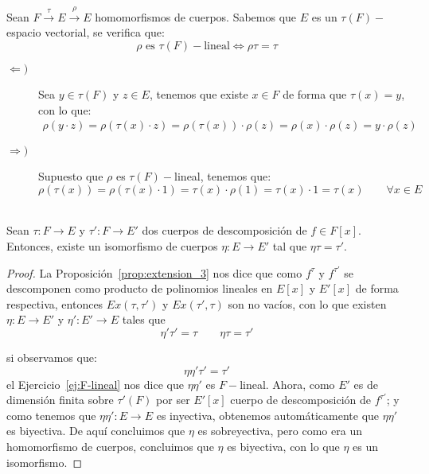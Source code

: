 \begin{ejercicio}\label{ej:F-lineal}
    Sean $F\stackrel{\tau}{\to}E\stackrel{\rho}{\to}E$ homomorfismos de cuerpos. Sabemos que $E$ es un $\tau(F)-$espacio vectorial, se verifica que: 
    \begin{equation*}
        \rho \text{\ es\ } \tau(F)-\text{lineal} \Longleftrightarrow \rho\tau = \tau
    \end{equation*}

    \begin{description}
        \item [$\Longleftarrow )$] Sea $y\in \tau(F)$ y $z\in E$, tenemos que existe $x\in F$ de forma que $\tau(x)=y$, con lo que:
            \begin{align*}
                \rho(y\cdot z) = \rho(\tau(x)\cdot z) = \rho(\tau(x))\cdot \rho(z) = \rho(x)\cdot \rho(z) = y\cdot \rho(z)
            \end{align*}
        \item [$\Longrightarrow )$] Supuesto que $\rho$ es $\tau(F)-$lineal, tenemos que:
            \begin{equation*} 
                \rho(\tau(x)) = \rho(\tau(x)\cdot 1)= \tau(x)\cdot \rho(1) = \tau(x)\cdot 1 = \tau(x) \qquad \forall x\in E
            \end{equation*}
    \end{description}
\end{ejercicio}

\begin{teo} \ \\
    Sean $\tau:F\to E$ y $\tau':F\to E'$ dos cuerpos de descomposición de $f\in F[x]$. Entonces, existe un isomorfismo de cuerpos $\eta:E\to E'$ tal que $\eta \tau = \tau'$.
    \begin{proof}
        La Proposición~\ref{prop:extension_3} nos dice que como $f^\tau$ y $f^{\tau'}$ se descomponen como producto de polinomios lineales en $E[x]$ y $E'[x]$ de forma respectiva, entonces $Ex(\tau,\tau')$ y $Ex(\tau',\tau)$ son no vacíos, con lo que existen $\eta:E\to E'$ y $\eta':E'\to E$ tales que 
        \begin{equation*}
            \eta'\tau' = \tau\qquad \eta\tau = \tau'
        \end{equation*}

        si observamos que:
        \begin{equation*}
            \eta\eta'\tau' = \tau'
        \end{equation*}
        el Ejercicio~\ref{ej:F-lineal} nos dice que $\eta\eta'$ es $F-$lineal. Ahora, como $E'$ es de dimensión finita sobre $\tau'(F)$ por ser $E'[x]$ cuerpo de descomposición de $f^{\tau'}$; y como tenemos que $\eta\eta':E\to E$ es inyectiva, obtenemos automáticamente que $\eta\eta'$ es biyectiva. De aquí concluimos que $\eta$ es sobreyectiva, pero como era un homomorfismo de cuerpos, concluimos que $\eta$ es biyectiva, con lo que $\eta$ es un isomorfismo.
    \end{proof}
\end{teo}


